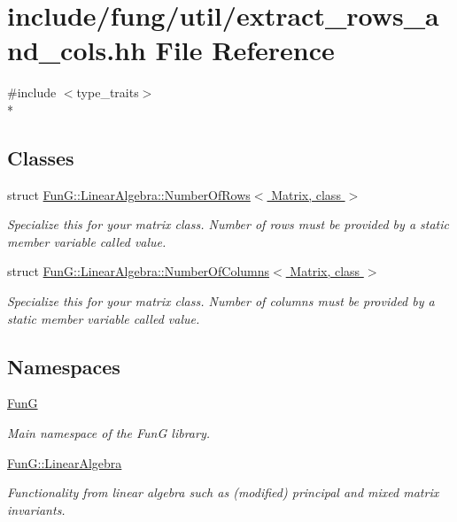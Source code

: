 \hypertarget{extract__rows__and__cols_8hh}{}\section{include/fung/util/extract\+\_\+rows\+\_\+and\+\_\+cols.hh File Reference}
\label{extract__rows__and__cols_8hh}
{\ttfamily \#include $<$type\+\_\+traits$>$}\\*
\subsection*{Classes}
\begin{DoxyCompactItemize}
\item 
struct \hyperlink{structFunG_1_1LinearAlgebra_1_1NumberOfRows}{Fun\+G\+::\+Linear\+Algebra\+::\+Number\+Of\+Rows$<$ Matrix, class $>$}
\begin{DoxyCompactList}\small\item\em Specialize this for your matrix class. Number of rows must be provided by a static member variable called value. \end{DoxyCompactList}\item 
struct \hyperlink{structFunG_1_1LinearAlgebra_1_1NumberOfColumns}{Fun\+G\+::\+Linear\+Algebra\+::\+Number\+Of\+Columns$<$ Matrix, class $>$}
\begin{DoxyCompactList}\small\item\em Specialize this for your matrix class. Number of columns must be provided by a static member variable called value. \end{DoxyCompactList}\end{DoxyCompactItemize}
\subsection*{Namespaces}
\begin{DoxyCompactItemize}
\item 
 \hyperlink{namespaceFunG}{FunG}
\begin{DoxyCompactList}\small\item\em Main namespace of the FunG library. \end{DoxyCompactList}\item 
 \hyperlink{namespaceFunG_1_1LinearAlgebra}{Fun\+G\+::\+Linear\+Algebra}
\begin{DoxyCompactList}\small\item\em Functionality from linear algebra such as (modified) principal and mixed matrix invariants. \end{DoxyCompactList}\end{DoxyCompactItemize}
